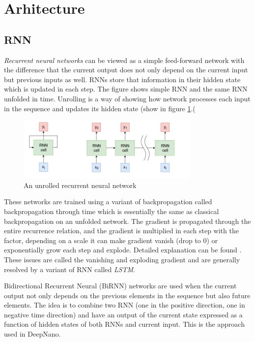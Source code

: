\documentclass[times, utf8, diplomski, numeric, english]{fer}
\begin{document}
\section{Arhitecture}

\subsection{RNN}
\textit{Recurrent neural networks} can be viewed as a simple feed-forward network with the difference that the current output does not only depend on the current input but previous inputs as well. RNNs store that information in their hidden state which is updated in each step. The figure shows simple RNN and the same RNN unfolded in time.  Unrolling is a way of showing how network processes each input in the sequence and updates its hidden state (show in figure  \ref{fg:rnn}.( 
\begin{figure}[!ht]
	\begin{center}
		\includegraphics[width=0.8\textwidth]{./imgs/rnn.png}
		\caption{An unrolled recurrent neural network}
		\label{fg:rnn}
	\end{center}
\end{figure}

These networks are trained using a variant of backpropagation called backpropagation through time which is essentially the same as classical backpropagation on an unfolded network. The gradient is propagated through the entire recurrence relation, and the gradient is multiplied in each step with the factor, depending on a scale it can make gradient vanish (drop to 0) or exponentially grow each step and explode. Detailed explanation can be found \cite{rnn-blog}. These issues are called the vanishing and exploding gradient\cite{rnn-blog} and are generally resolved by a variant of RNN called \textit{LSTM}\cite{hochreiter1997long}. 

Bidirectional Recurrent Neural (BiRNN) networks are used when the current output not only depends on the previous elements in the sequence but also future elements. The idea is to combine two RNN (one in the positive direction, one in negative time direction) and have an output of the current state expressed as a function of hidden states of both RNNs and current input. This is the approach used in DeepNano\cite{Boza2017}. 
\end{document}

